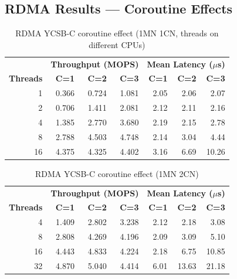 \documentclass[11pt,a4paper]{article}
\begin{document}
\subsection{RDMA Results --- Coroutine Effects}

\begin{table}[H]
\centering
\caption{RDMA YCSB-C coroutine effect (1MN 1CN, threads on different CPUs)}
\label{tab:rdma-coro-1cn}
\small
\begin{tabular}{@{}rrrr|rrr@{}}
\toprule
& \multicolumn{3}{c|}{\textbf{Throughput (MOPS)}} & \multicolumn{3}{c}{\textbf{Mean Latency ($\mu$s)}} \\
\textbf{Threads} & \textbf{C=1} & \textbf{C=2} & \textbf{C=3} & \textbf{C=1} & \textbf{C=2} & \textbf{C=3} \\
\midrule
1  & 0.366 & 0.724 & 1.081 & 2.05 & 2.06 & 2.07 \\
2  & 0.706 & 1.411 & 2.081 & 2.12 & 2.11 & 2.16 \\
4  & 1.385 & 2.770 & 3.680 & 2.19 & 2.15 & 2.78 \\
8  & 2.788 & 4.503 & 4.748 & 2.14 & 3.04 & 4.44 \\
16 & 4.375 & 4.325 & 4.402 & 3.16 & 6.69 & 10.26 \\
\bottomrule
\end{tabular}
\end{table}

\begin{table}[H]
\centering
\caption{RDMA YCSB-C coroutine effect (1MN 2CN)}
\label{tab:rdma-coro-2cn}
\small
\begin{tabular}{@{}rrrr|rrr@{}}
\toprule
& \multicolumn{3}{c|}{\textbf{Throughput (MOPS)}} & \multicolumn{3}{c}{\textbf{Mean Latency ($\mu$s)}} \\
\textbf{Threads} & \textbf{C=1} & \textbf{C=2} & \textbf{C=3} & \textbf{C=1} & \textbf{C=2} & \textbf{C=3} \\
\midrule
4  & 1.409 & 2.802 & 3.238 & 2.12 & 2.18 & 3.08 \\
8  & 2.808 & 4.269 & 4.196 & 2.09 & 3.09 & 5.10 \\
16 & 4.443 & 4.833 & 4.224 & 2.18 & 6.75 & 10.85 \\
32 & 4.870 & 5.040 & 4.414 & 6.01 & 13.63 & 21.18 \\
\bottomrule
\end{tabular}
\end{table}
\end{document}
